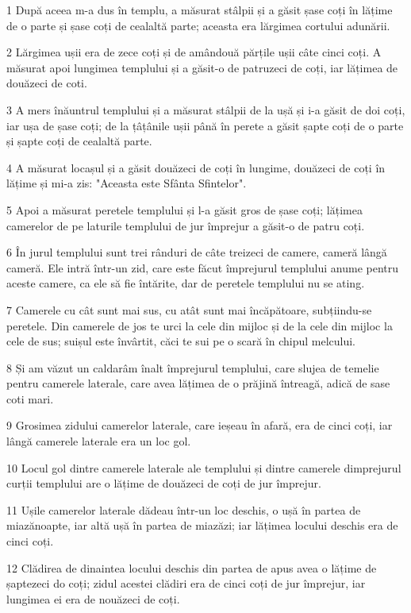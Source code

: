 \par 1 După aceea m-a dus în templu, a măsurat stâlpii și a găsit șase coți în lățime de o parte și șase coți de cealaltă parte; aceasta era lărgimea cortului adunării.
\par 2 Lărgimea ușii era de zece coți și de amândouă părțile ușii câte cinci coți. A măsurat apoi lungimea templului și a găsit-o de patruzeci de coți, iar lățimea de douăzeci de coti.
\par 3 A mers înăuntrul templului și a măsurat stâlpii de la ușă și i-a găsit de doi coți, iar ușa de șase coți; de la țâțânile ușii până în perete a găsit șapte coți de o parte și șapte coți de cealaltă parte.
\par 4 A măsurat locașul și a găsit douăzeci de coți în lungime, douăzeci de coți în lățime și mi-a zis: "Aceasta este Sfânta Sfintelor".
\par 5 Apoi a măsurat peretele templului și l-a găsit gros de șase coți; lățimea camerelor de pe laturile templului de jur împrejur a găsit-o de patru coți.
\par 6 În jurul templului sunt trei rânduri de câte treizeci de camere, cameră lângă cameră. Ele intră într-un zid, care este făcut împrejurul templului anume pentru aceste camere, ca ele să fie întărite, dar de peretele templului nu se ating.
\par 7 Camerele cu cât sunt mai sus, cu atât sunt mai încăpătoare, subțiindu-se peretele. Din camerele de jos te urci la cele din mijloc și de la cele din mijloc la cele de sus; suișul este învârtit, căci te sui pe o scară în chipul melcului.
\par 8 Și am văzut un caldarâm înalt împrejurul templului, care slujea de temelie pentru camerele laterale, care avea lățimea de o prăjină întreagă, adică de sase coti mari.
\par 9 Grosimea zidului camerelor laterale, care ieșeau în afară, era de cinci coți, iar lângă camerele laterale era un loc gol.
\par 10 Locul gol dintre camerele laterale ale templului și dintre camerele dimprejurul curții templului are o lățime de douăzeci de coți de jur împrejur.
\par 11 Ușile camerelor laterale dădeau într-un loc deschis, o ușă în partea de miazănoapte, iar altă ușă în partea de miazăzi; iar lățimea locului deschis era de cinci coți.
\par 12 Clădirea de dinaintea locului deschis din partea de apus avea o lățime de șaptezeci do coți; zidul acestei clădiri era de cinci coți de jur împrejur, iar lungimea ei era de nouăzeci de coți.
